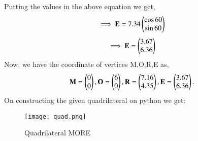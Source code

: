 \documentclass[journal,12pt,twocolumn]{IEEEtran}
\begin{document}
 Putting the values in the above equation we get,
 \begin{align}
     \implies \mathbf{E}= 7.34 \begin{pmatrix}\cos 60\\ \sin 60\end{pmatrix}
 \end{align}
 \begin{align}
     \implies \mathbf{E}= \begin{pmatrix}3.67\\6.36\end{pmatrix}
 \end{align}
   Now, we have the coordinate of vertices M,O,R,E as,
\begin{align}
\mathbf{M}= \begin{pmatrix}0 \\ 0\end{pmatrix}, \mathbf{O}= \begin{pmatrix}6 \\ 0\end{pmatrix},  \mathbf{R}= \begin{pmatrix}7.16 \\ 4.35\end{pmatrix}, \mathbf{E}= \begin{pmatrix}3.67 \\ 6.36\end{pmatrix}.
\end{align}    
      On constructing the given quadrilateral on python  we get:
\begin{figure}[!ht]
\texttt{[image: quad.png]}
\caption{Quadrilateral MORE}
\label{fig:Quadrilateral MORE}	
\end{figure}
\end{document}

